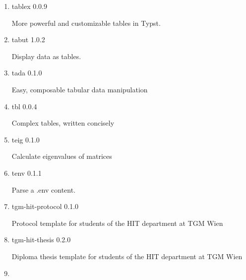 \begin{enumerate}
  { tablem } { 0.1.0 }

  Write markdown-like tables easily.
\item
  \href{/universe/package/tablex/}{}

  { tablex } { 0.0.9 }

  More powerful and customizable tables in Typst.
\item
  \href{/universe/package/tabut/}{}

  { tabut } { 1.0.2 }

  Display data as tables.
\item
  \href{/universe/package/tada/}{}

  { tada } { 0.1.0 }

  Easy, composable tabular data manipulation
\item
  \href{/universe/package/tbl/}{}

  { tbl } { 0.0.4 }

  Complex tables, written concisely
\item
  \href{/universe/package/teig/}{}

  { teig } { 0.1.0 }

  Calculate eigenvalues of matrices
\item
  \href{/universe/package/tenv/}{}

  { tenv } { 0.1.1 }

  Parse a .env content.
\item
  \href{/universe/package/tgm-hit-protocol/}{}


  { tgm-hit-protocol } { 0.1.0 }

  Protocol template for students of the HIT department at TGM Wien
\item
  \href{/universe/package/tgm-hit-thesis/}{}


  { tgm-hit-thesis } { 0.2.0 }

  Diploma thesis template for students of the HIT department at TGM Wien

  { }
\item
  \href{/universe/package/thesist/}{}



\end{enumerate}
